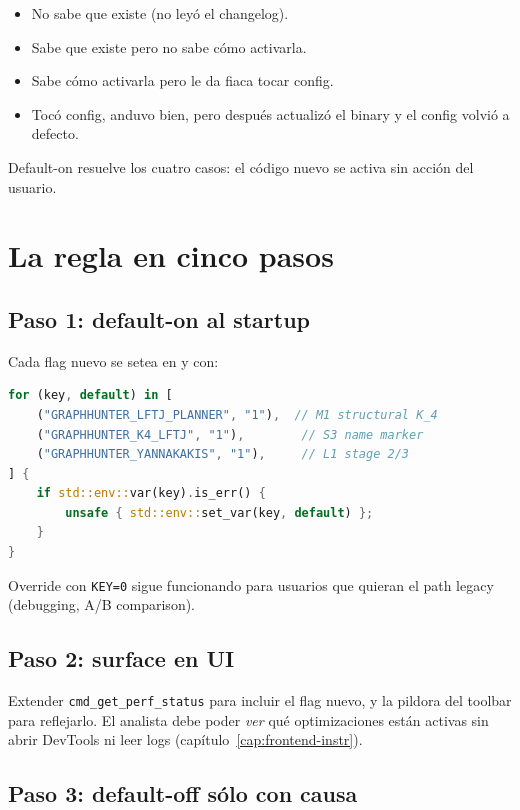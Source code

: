 \begin{itemize}
    \item No sabe que existe (no leyó el changelog).
    \item Sabe que existe pero no sabe cómo activarla.
    \item Sabe cómo activarla pero le da fiaca tocar config.
    \item Tocó config, anduvo bien, pero después actualizó el
    binary y el config volvió a defecto.
\end{itemize}

\noindent
Default-on resuelve los cuatro casos: el código nuevo se activa
sin acción del usuario.

\section{La regla en cinco pasos}

\subsection{Paso 1: default-on al startup}

Cada flag nuevo se setea en 
y  con:

\begin{lstlisting}[language=Rust]
for (key, default) in [
    ("GRAPHHUNTER_LFTJ_PLANNER", "1"),  // M1 structural K_4
    ("GRAPHHUNTER_K4_LFTJ", "1"),        // S3 name marker
    ("GRAPHHUNTER_YANNAKAKIS", "1"),     // L1 stage 2/3
] {
    if std::env::var(key).is_err() {
        unsafe { std::env::set_var(key, default) };
    }
}
\end{lstlisting}

\noindent
Override con \texttt{KEY=0} sigue funcionando para usuarios que
quieran el path legacy (debugging, A/B comparison).

\subsection{Paso 2: surface en UI}

Extender \texttt{cmd\_get\_perf\_status} para incluir el flag
nuevo, y la pildora del toolbar para reflejarlo. El analista debe
poder \emph{ver} qué optimizaciones están activas sin abrir
DevTools ni leer logs (capítulo~\ref{cap:frontend-instr}).

\subsection{Paso 3: default-off sólo con causa}

